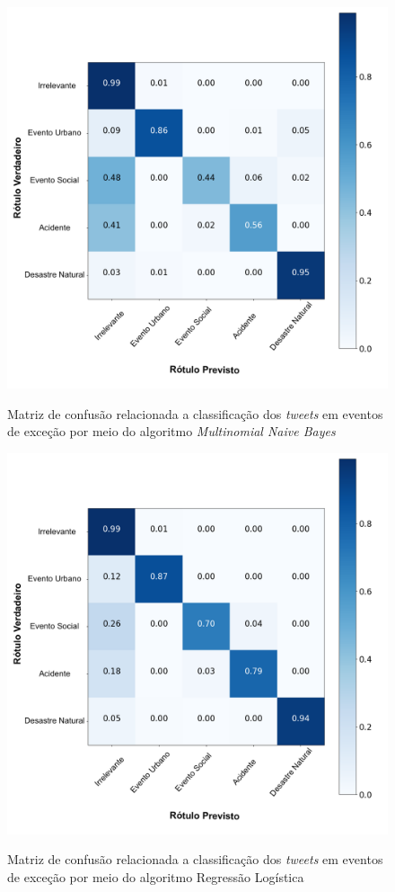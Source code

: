 \documentclass[
	12pt,				%
	oneside,			%
	a4paper,			%
	english,			%
	brazil				%
	]{abntex2ppgsi}
\begin{document}
{{{\begin{apendicesenv}
\begin{figure}[!htb]
	\centering
 	  \caption{Matriz de confusão relacionada a classificação dos \textit{tweets} em eventos de exceção por meio do algoritmo \textit{Multinomial Naive Bayes}}
		\includegraphics[width=1\linewidth]{images/confusion_matrix_mnb_pt.png}
	\label{fig:confusion_matrix_mnb}
\end{figure}

\begin{figure}[!htb]
	\centering
 	  \caption{Matriz de confusão relacionada a classificação dos \textit{tweets} em eventos de exceção por meio do algoritmo Regressão Logística}
		\includegraphics[width=1\linewidth]{images/confusion_matrix_lr_pt.png}
	\label{fig:confusion_matrix_rl}
\end{figure}


\end{apendicesenv}}}}
\end{document}
